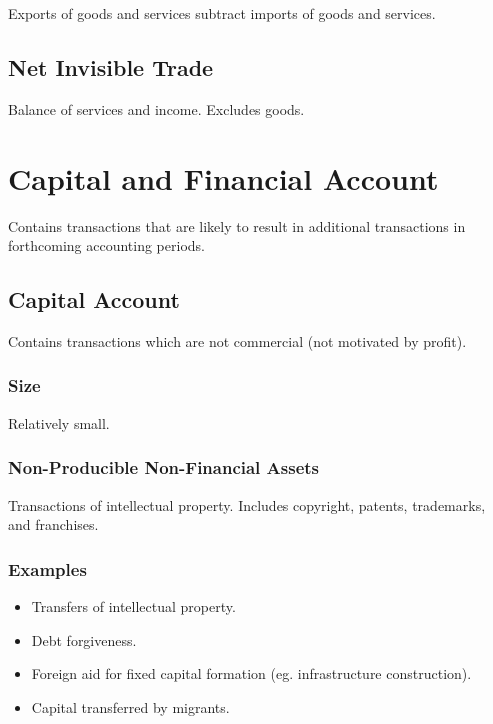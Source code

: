 \documentclass[a4paper,11pt]{article}
\begin{document}
Exports of goods and services subtract imports of goods and services.


\subsection{Net Invisible Trade}

Balance of services and income. Excludes goods.




\section{Capital and Financial Account}

Contains transactions that are likely to result in additional transactions in
forthcoming accounting periods.


\subsection{Capital Account}

Contains transactions which are not commercial (not motivated by profit).


\subsubsection{Size}

Relatively small.


\subsubsection{Non-Producible Non-Financial Assets}

Transactions of intellectual property. Includes copyright, patents, trademarks,
and franchises.


\subsubsection{Examples}

\begin{itemize}
\item Transfers of intellectual property.
\item Debt forgiveness.
\item Foreign aid for fixed capital formation (eg. infrastructure construction).
\item Capital transferred by migrants.
\end{itemize}
\end{document}
